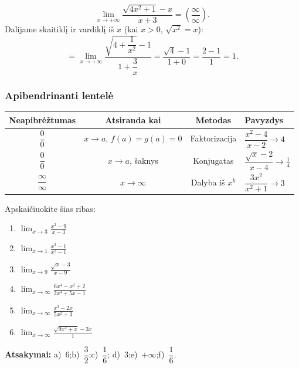 \begin{example}
\[
  \lim_{x \to +\infty} \frac{\sqrt{4x^2 + 1} - x}{x + 3}
  = \left(\frac{\infty}{\infty}\right).
\]
Dalijame skaitiklį ir vardiklį iš $x$ (kai $x > 0$, $\sqrt{x^2} = x$):
\[
  = \lim_{x \to +\infty}
    \frac{\sqrt{4 + \dfrac{1}{x^2}} - 1}{1 + \dfrac{3}{x}}
  = \frac{\sqrt{4} - 1}{1 + 0}
  = \frac{2 - 1}{1}
  = 1.
\]
\end{example}

\subsubsection*{Apibendrinanti lentelė}

\begin{center}
\begin{tabular}{|c|c|c|l|}
  \hline
  \textbf{Neapibrėžtumas} & \textbf{Atsiranda kai} & \textbf{Metodas} & \textbf{Pavyzdys} \\
  \hline
  $\dfrac{0}{0}$ & $x \to a$, $f(a)=g(a)=0$ & Faktorizacija & $\dfrac{x^2-4}{x-2} \to 4$ \\[6pt]
  $\dfrac{0}{0}$ & $x \to a$, šaknys & Konjugatas & $\dfrac{\sqrt{x}-2}{x-4} \to \frac{1}{4}$ \\[6pt]
  $\dfrac{\infty}{\infty}$ & $x \to \infty$ & Dalyba iš $x^k$ & $\dfrac{3x^2}{x^2+1} \to 3$ \\[6pt]
  \hline
\end{tabular}
\end{center}

\begin{exercise}
Apskaičiuokite šias ribas:
\begin{enumerate}[label=\alph*)]
  \item $\displaystyle\lim_{x \to 3} \frac{x^2 - 9}{x - 3}$
  \item $\displaystyle\lim_{x \to 1} \frac{x^3 - 1}{x^2 - 1}$
  \item $\displaystyle\lim_{x \to 9} \frac{\sqrt{x} - 3}{x - 9}$
  \item $\displaystyle\lim_{x \to \infty} \frac{6x^4 - x^2 + 2}{2x^4 + 5x - 1}$
  \item $\displaystyle\lim_{x \to \infty} \frac{x^3 - 2x}{5x^2 + 3}$
  \item $\displaystyle\lim_{x \to \infty} \frac{\sqrt{9x^2 + x} - 3x}{1}$
\end{enumerate}

\textbf{Atsakymai:} a)~$6$;\quad b)~$\dfrac{3}{2}$;\quad c)~$\dfrac{1}{6}$;\quad
d)~$3$;\quad e)~$+\infty$;\quad f)~$\dfrac{1}{6}$.
\end{exercise}

